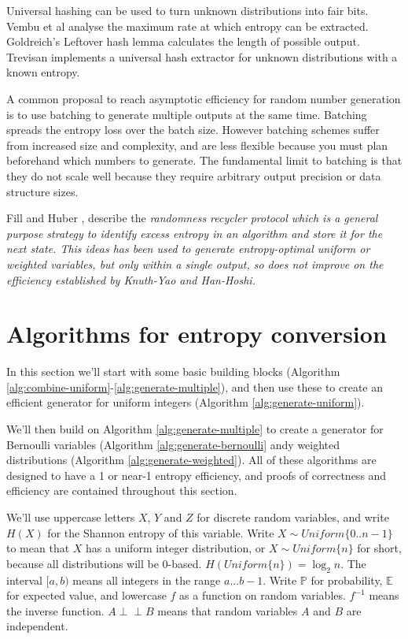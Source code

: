 \documentclass[12pt]{article}
\newcommand{\indep}{\perp\!\!\!\perp}
\begin{document}
Universal hashing can be used to turn unknown distributions into fair bits. Vembu et al \cite{vembu95} analyse the maximum rate at which entropy can be extracted. Goldreich's Leftover hash lemma \cite{goldreich2004foundations} calculates the length of possible output. Trevisan \cite{trevisan2001extractors} implements a universal hash extractor for unknown distributions with a known entropy. 

A common proposal to reach asymptotic efficiency for random number generation is to use batching to generate multiple outputs at the same time. \cite{bacher2017,han97,devroye86,Knuth1976TheCO,lumbroso2013optimal} Batching spreads the entropy loss over the batch size. However batching schemes suffer from increased size and complexity, and are less flexible because you must plan beforehand which numbers to generate. The fundamental limit to batching is that they do not scale well because they require arbitrary output precision or data structure sizes.

Fill and Huber \cite{fill2000randomness, huber2016perfect}, describe the \em randomness recycler \em protocol which is a general purpose strategy to identify excess entropy in an algorithm and store it for the next state. This ideas has been used to generate entropy-optimal uniform \cite{lumbroso2013optimal, huber2024optimal} or weighted \cite{huber2024optimal} variables, but only within a single output, so does not improve on the efficiency established by Knuth-Yao and Han-Hoshi.


\section{Algorithms for entropy conversion}

In this section we'll start with some basic building blocks (Algorithm \ref{alg:combine-uniform}-\ref{alg:generate-multiple}), and then use these to create an efficient generator for uniform integers (Algorithm \ref{alg:generate-uniform}).

We'll then build on Algorithm \ref{alg:generate-multiple} to create a generator for Bernoulli variables (Algorithm \ref{alg:generate-bernoulli} andy weighted distributions (Algorithm \ref{alg:generate-weighted}). All of these algorithms are designed to have a 1 or near-1 entropy efficiency, and proofs of correctness and efficiency are contained throughout this section.

We'll use uppercase letters $X$, $Y$ and $Z$ for discrete random variables, and write $H(X)$ for the Shannon entropy of this variable. Write $X \sim Uniform\{0..n-1\}$ to mean that $X$ has a uniform integer distribution, or $X \sim Uniform\{n\}$ for short, because all distributions will be 0-based. $H(Uniform\{n\}) = \log_2n$. The interval $[a,b)$ means all integers in the range $a...b-1$. Write $\mathbb{P}$ for probability, $\mathbb{E}$ for expected value, and lowercase $f$ as a function on random variables. $f^{-1}$ means the inverse function. $A \indep B$ means that random variables $A$ and $B$ are independent.
\end{document}
